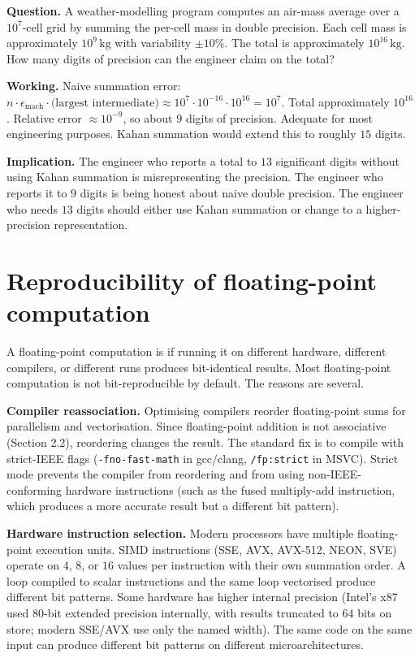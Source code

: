 \begin{estimation}
\textbf{Question.} A weather-modelling program computes an air-mass average over a $10^7$-cell grid by summing the per-cell mass in double precision. Each cell mass is approximately $10^9\,\si{\kilogram}$ with variability $\pm 10\%$. The total is approximately $10^{16}\,\si{\kilogram}$. How many digits of precision can the engineer claim on the total?

\textbf{Working.} Naive summation error: $n \cdot \epsilon_{\mathrm{mach}} \cdot \text{(largest intermediate)} \approx 10^7 \cdot 10^{-16} \cdot 10^{16} = 10^7$. Total approximately $10^{16}$. Relative error $\approx 10^{-9}$, so about $9$ digits of precision. Adequate for most engineering purposes. Kahan summation would extend this to roughly $15$ digits.

\textbf{Implication.} The engineer who reports a total to $13$ significant digits without using Kahan summation is misrepresenting the precision. The engineer who reports it to $9$ digits is being honest about naive double precision. The engineer who needs $13$ digits should either use Kahan summation or change to a higher-precision representation.
\end{estimation}

\section{Reproducibility of floating-point computation}

A floating-point computation is  if running it on different hardware, different compilers, or different runs produces bit-identical results. Most floating-point computation is not bit-reproducible by default. The reasons are several.

\textbf{Compiler reassociation.} Optimising compilers reorder floating-point sums for parallelism and vectorisation. Since floating-point addition is not associative (Section 2.2), reordering changes the result. The standard fix is to compile with strict-IEEE flags (\texttt{-fno-fast-math} in gcc/clang, \texttt{/fp:strict} in MSVC). Strict mode prevents the compiler from reordering and from using non-IEEE-conforming hardware instructions (such as the fused multiply-add instruction, which produces a more accurate result but a different bit pattern).

\textbf{Hardware instruction selection.} Modern processors have multiple floating-point execution units. SIMD instructions (SSE, AVX, AVX-512, NEON, SVE) operate on $4$, $8$, or $16$ values per instruction with their own summation order. A loop compiled to scalar instructions and the same loop vectorised produce different bit patterns. Some hardware has higher internal precision (Intel's x87 used $80$-bit extended precision internally, with results truncated to $64$ bits on store; modern SSE/AVX use only the named width). The same code on the same input can produce different bit patterns on different microarchitectures.

